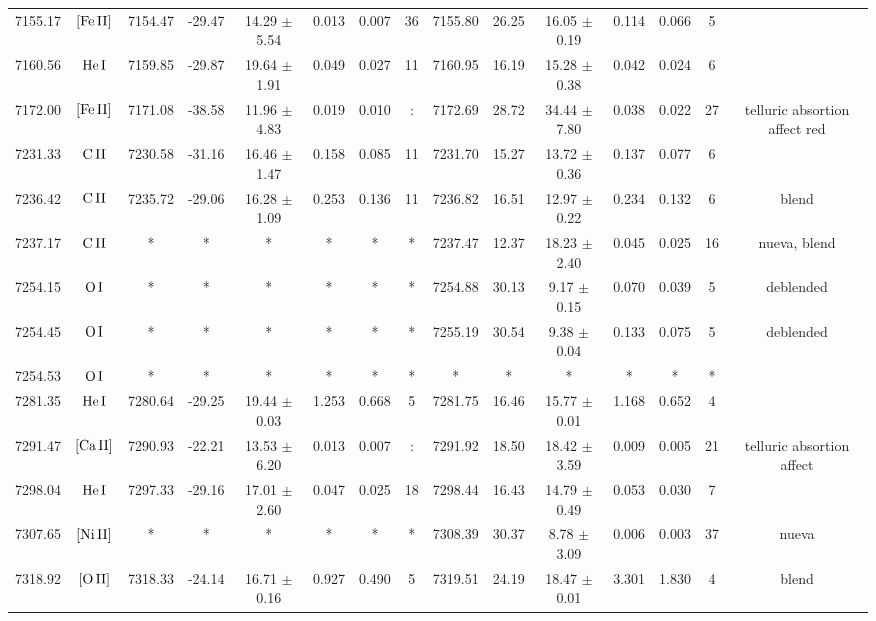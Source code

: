 \documentclass{article}
\begin{document}
\begin{table*}
\begin{adjustbox}{width=\textwidth}
\begin{tabular}{ccccccccccccccc}
7155.17 & $\mbox{[Fe}\thinspace \mbox{II]}$ & 7154.47 & -29.47 & 14.29 $\pm$ 5.54 & 0.013 & 0.007 & 36 & 7155.80 & 26.25 & 16.05 $\pm$ 0.19 & 0.114 & 0.066 & 5 &  \\
7160.56 & $\mbox{He}\thinspace \mbox{I}$ & 7159.85 & -29.87 & 19.64 $\pm$ 1.91 & 0.049 & 0.027 & 11 & 7160.95 & 16.19 & 15.28 $\pm$ 0.38 & 0.042 & 0.024 & 6 &  \\
7172.00 & $\mbox{[Fe}\thinspace \mbox{II]}$ & 7171.08 & -38.58 & 11.96 $\pm$ 4.83 & 0.019 & 0.010 & : & 7172.69 & 28.72 & 34.44 $\pm$ 7.80 & 0.038 & 0.022 & 27 &  telluric absortion affect red \\
7231.33 & $\mbox{C}\thinspace \mbox{II}$ & 7230.58 & -31.16 & 16.46 $\pm$ 1.47 & 0.158 & 0.085 & 11 & 7231.70 & 15.27 & 13.72 $\pm$ 0.36 & 0.137 & 0.077 & 6 &  \\
7236.42 & $\mbox{C}\thinspace \mbox{II}$ & 7235.72 & -29.06 & 16.28 $\pm$ 1.09 & 0.253 & 0.136 & 11 & 7236.82 & 16.51 & 12.97 $\pm$ 0.22 & 0.234 & 0.132 & 6 &  blend \\
7237.17 & $\mbox{C}\thinspace \mbox{II}$ & * & * & * & * & * & * & 7237.47 & 12.37 & 18.23 $\pm$ 2.40 & 0.045 & 0.025 & 16 &  nueva, blend \\
7254.15 & $\mbox{O}\thinspace \mbox{I}$ & * & * & * & * & * & * & 7254.88 & 30.13 & 9.17 $\pm$ 0.15 & 0.070 & 0.039 & 5 &  deblended \\
7254.45 & $\mbox{O}\thinspace \mbox{I}$ & * & * & * & * & * & * & 7255.19 & 30.54 & 9.38 $\pm$ 0.04 & 0.133 & 0.075 & 5 &  deblended \\
7254.53 & $\mbox{O}\thinspace \mbox{I}$ & * & * & * & * & * & * & * & * & * & * & * & * &  \\
7281.35 & $\mbox{He}\thinspace \mbox{I}$ & 7280.64 & -29.25 & 19.44 $\pm$ 0.03 & 1.253 & 0.668 & 5 & 7281.75 & 16.46 & 15.77 $\pm$ 0.01 & 1.168 & 0.652 & 4 &  \\
7291.47 & $\mbox{[Ca}\thinspace \mbox{II]}$ & 7290.93 & -22.21 & 13.53 $\pm$ 6.20 & 0.013 & 0.007 & : & 7291.92 & 18.50 & 18.42 $\pm$ 3.59 & 0.009 & 0.005 & 21 &  telluric absortion affect \\
7298.04 & $\mbox{He}\thinspace \mbox{I}$ & 7297.33 & -29.16 & 17.01 $\pm$ 2.60 & 0.047 & 0.025 & 18 & 7298.44 & 16.43 & 14.79 $\pm$ 0.49 & 0.053 & 0.030 & 7 &  \\
7307.65 & $\mbox{[Ni}\thinspace \mbox{II]}$ & * & * & * & * & * & * & 7308.39 & 30.37 & 8.78 $\pm$ 3.09 & 0.006 & 0.003 & 37 &  nueva \\
7318.92 & $\mbox{[O}\thinspace \mbox{II]}$ & 7318.33 & -24.14 & 16.71 $\pm$ 0.16 & 0.927 & 0.490 & 5 & 7319.51 & 24.19 & 18.47 $\pm$ 0.01 & 3.301 & 1.830 & 4 &  blend \\

\end{tabular}
\end{adjustbox}
\end{table*}
\end{document}
